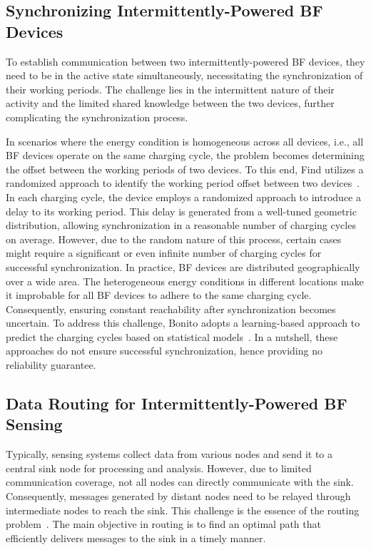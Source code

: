 \documentclass[lettersize,journal]{IEEEtran}
\begin{document}
\subsection{Synchronizing Intermittently-Powered BF Devices}
\label{sec:motivation:sync}
To establish communication between two intermittently-powered BF devices, they need to be in the active state simultaneously, necessitating the synchronization of their working periods. The challenge lies in the intermittent nature of their activity and the limited shared knowledge between the two devices, further complicating the synchronization process.

In scenarios where the energy condition is homogeneous across all devices, i.e., all BF devices operate on the same charging cycle, the problem becomes determining the offset between the working periods of two devices. To this end, Find utilizes a randomized approach to identify the working period offset between two devices~\cite{2021-nsdi-find}. In each charging cycle, the device employs a randomized approach to introduce a delay to its working period. This delay is generated from a well-tuned geometric distribution, allowing synchronization in a reasonable number of charging cycles on average. However, due to the random nature of this process, certain cases might require a significant or even infinite number of charging cycles for successful synchronization. In practice, BF devices are distributed geographically over a wide area. The heterogeneous energy conditions in different locations make it improbable for all BF devices to adhere to the same charging cycle. Consequently, ensuring constant reachability after synchronization becomes uncertain. To address this challenge, Bonito adopts a learning-based approach to predict the charging cycles based on statistical models~\cite{2022-nsdi-bonito}. In a nutshell, these approaches do not ensure successful synchronization, hence providing no reliability guarantee.

\subsection{Data Routing for Intermittently-Powered BF Sensing}
\label{sec:motivation:routing}
Typically, sensing systems collect data from various nodes and send it to a central sink node for processing and analysis. However, due to limited communication coverage, not all nodes can directly communicate with the sink. Consequently, messages generated by distant nodes need to be relayed through intermediate nodes to reach the sink. This challenge is the essence of the routing problem~\cite{2012-csur-wsn}. The main objective in routing is to find an optimal path that efficiently delivers messages to the sink in a timely manner.
\end{document}
